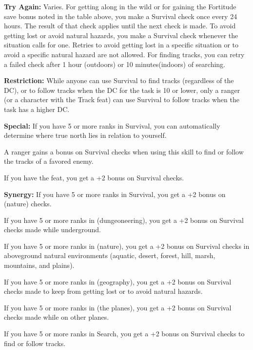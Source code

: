 \textbf{Try Again:} Varies. For getting along in the wild or for gaining the Fortitude save bonus noted in the table above, you make a Survival check once every 24 hours. The result of that check applies until the next check is made. To avoid getting lost or avoid natural hazards, you make a Survival check whenever the situation calls for one. Retries to avoid getting lost in a specific situation or to avoid a specific natural hazard are not allowed. For finding tracks, you can retry a failed check after 1 hour (outdoors) or 10 minutes(indoors) of searching.

\textbf{Restriction:} While anyone can use Survival to find tracks (regardless of the DC), or to follow tracks when the DC for the task is 10 or lower, only a ranger (or a character with the Track feat) can use Survival to follow tracks when the task has a higher DC.

\textbf{Special:} If you have 5 or more ranks in Survival, you can automatically determine where true north lies in relation to yourself.

A ranger gains a bonus on Survival checks when using this skill to find or follow the tracks of a favored enemy.

If you have the  feat, you get a +2 bonus on Survival checks.

\textbf{Synergy:} If you have 5 or more ranks in Survival, you get a +2 bonus on  (nature) checks.

If you have 5 or more ranks in  (dungeoneering), you get a +2 bonus on Survival checks made while underground.

If you have 5 or more ranks in  (nature), you get a +2 bonus on Survival checks in aboveground natural environments (aquatic, desert, forest, hill, marsh, mountains, and plains).

If you have 5 or more ranks in  (geography), you get a +2 bonus on Survival checks made to keep from getting lost or to avoid natural hazards.

If you have 5 or more ranks in  (the planes), you get a +2 bonus on Survival checks made while on other planes.

If you have 5 or more ranks in Search, you get a +2 bonus on Survival checks to find or follow tracks.

